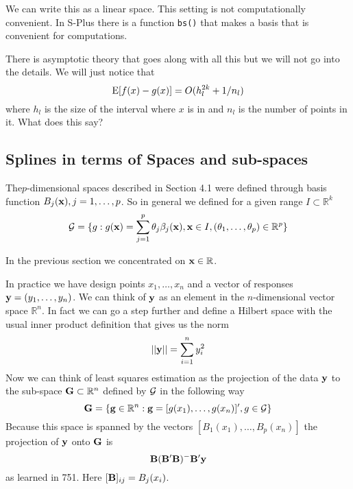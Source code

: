 We can write this as a linear space. This setting is not
computationally convenient. In S-Plus there is a function {\tt bs()}
that makes a basis that is convenient for computations. 

There is asymptotic theory that goes along with all this but we will
not go into the details. We will just notice that 
\[
\mbox{E}[ f(x) - g(x) ] = O(h_l^{2k} + 1/n_l)
\]
where $h_l$ is the size of the interval where $x$ is in and $n_l$ is
the number of points in it. What does this say?


\subsection{Splines in terms of Spaces and sub-spaces}
The$p$-dimensional
spaces described in Section 4.1 were defined through basis function
$B_j({\mathbf x}), j=1,\dots,p$. So 
in general we defined for a given range $I \subset {\mathbb R}^k$
\[
{\cal G} =\{ g: g({\mathbf x}) = \sum_{j=1}^p \theta_j \beta_j({\mathbf x}), {\mathbf x} \in I,
(\theta_1,\dots,\theta_p) \in {\mathbb R}^p \}
\]

In the previous section we concentrated on ${\mathbf x} \in \mathbb R$. 

In practice we have design points $x_1,\dots,x_n$ and a vector of
responses ${\mathbf y} = (y_1,\dots,y_n)$. We can think of ${\mathbf y}$ as an element
in the $n$-dimensional vector space ${\mathbb R}^n$. In fact we can go
a step further and define a Hilbert space with the usual inner product
definition that gives us the norm
\[
||{\mathbf y}|| = \sum_{i=1}^n y_i^2
\]
Now we can think of least squares estimation as the projection of the
data ${\mathbf y}$ to the sub-space ${\mathbf G} \subset {\mathbb R}^n$ defined by $\cal
G$ in the following way 
\[
{\mathbf G} = \{ {\mathbf g} \in {\mathbb R}^n: {\mathbf g} = [g(x_1),\dots,g(x_n)]', g \in
{\cal G} \}
\]
Because this space is spanned by the vectors 
$[B_1(x_1),\dots,B_p(x_n) ]$ the projection of ${\mathbf y}$ onto ${\mathbf G}$ is 
\[
{\mathbf B}({\mathbf B}'{\mathbf B})^{-}{\mathbf B}'{\mathbf y}
\]
as learned in 751. Here $[{\mathbf B}]_{ij} = B_j(x_i)$.

